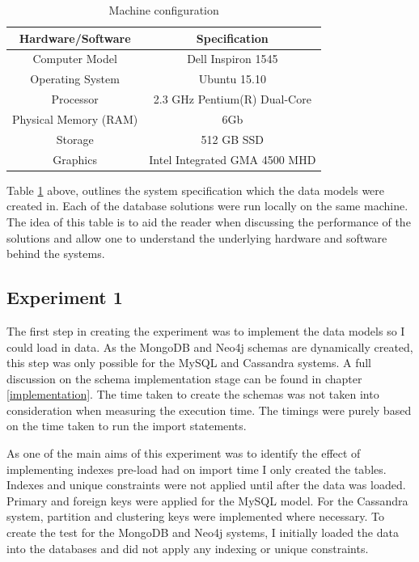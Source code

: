 \begin{table}[H]
\centering
\begin{tabular}{|c|c|}
\hline
\textbf{Hardware/Software} & \textbf{Specification} \\ \hline
Computer Model & Dell Inspiron 1545 \\ \hline
Operating System & Ubuntu 15.10 \\ \hline
Processor & 2.3 GHz Pentium(R) Dual-Core \\ \hline
Physical Memory (RAM) & 6Gb \\ \hline
Storage & 512 GB SSD \\ \hline
Graphics & Intel Integrated GMA 4500 MHD \\ \hline
\end{tabular}
\caption{Machine configuration}
\label{tab:sysspec}
\end{table}

Table \ref{tab:sysspec} above, outlines the system specification which the data models were created in. Each of the database solutions were run locally on the same machine. The idea of this table is to aid the reader when discussing the performance of the solutions and allow one to understand the underlying hardware and software behind the systems.

\subsection{Experiment 1}\label{experiment1}
The first step in creating the experiment was to implement the data models so I could load in data. As the MongoDB and Neo4j schemas are dynamically created, this step was only possible for the MySQL and Cassandra systems. A full discussion on the schema implementation stage can be found in chapter \ref{implementation}. The time taken to create the schemas was not taken into consideration when measuring the execution time. The timings were purely based on the time taken to run the import statements.

As one of the main aims of this experiment was to identify the effect of implementing indexes pre-load had on import time I only created the tables. Indexes and unique constraints were not applied until after the data was loaded. Primary and foreign keys were applied for the MySQL model. For the Cassandra system, partition and clustering keys were implemented where necessary. To create the test for the MongoDB and Neo4j systems, I initially loaded the data into the databases and did not apply any indexing or unique constraints.

